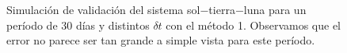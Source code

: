 \begin{figure}
{	\label{fig:ej1_m1_30_12}
	}
	\caption{
		Simulación de validación del sistema sol$-$tierra$-$luna para un período de 30 días y distintos $\delta t$
		con el método 1.
		Observamos que el error no parece ser tan grande a simple vista para este período.
	}
	\label{ fig:res_ej1_m1_30 }
\end{figure}
